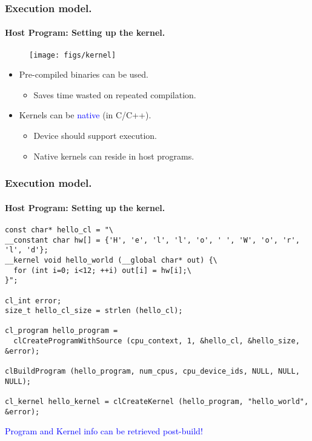 \documentclass{beamer}
\begin{document}
\begin{frame}
\frametitle{Execution model.}
\framesubtitle{Host Program: Setting up the kernel.}

  \begin{center}
  \begin{figure}
  \texttt{[image: figs/kernel]}
  \end{figure}
  \end{center}

  \begin{itemize}
  \item Pre-compiled binaries can be used.
    \begin{itemize}
    \item Saves time wasted on repeated compilation.
    \end{itemize}
  \item Kernels can be \textcolor{blue}{native} (in C/C++).
    \begin{itemize}
    \item Device should support execution.
    \item Native kernels can reside in host programs.
    \end{itemize}
  \end{itemize}

\end{frame}

\begin{frame}[fragile]
\frametitle{Execution model.}
\framesubtitle{Host Program: Setting up the kernel.}

  \begin{center}
  \begin{minipage}{0.70\textwidth}
  \begin{lstlisting}
const char* hello_cl = "\
__constant char hw[] = {'H', 'e', 'l', 'l', 'o', ' ', 'W', 'o', 'r', 'l', 'd'}; 
__kernel void hello_world (__global char* out) {\
  for (int i=0; i<12; ++i) out[i] = hw[i];\
}";

cl_int error;
size_t hello_cl_size = strlen (hello_cl);

cl_program hello_program = 
  clCreateProgramWithSource (cpu_context, 1, &hello_cl, &hello_size, &error);

clBuildProgram (hello_program, num_cpus, cpu_device_ids, NULL, NULL, NULL);

cl_kernel hello_kernel = clCreateKernel (hello_program, "hello_world", &error);
  \end{lstlisting}
  \end{minipage}
  \end{center}

  \begin{center}
  \textcolor{blue}{Program and Kernel info can be retrieved post-build!}
  \end{center}

\end{frame}
\end{document}
